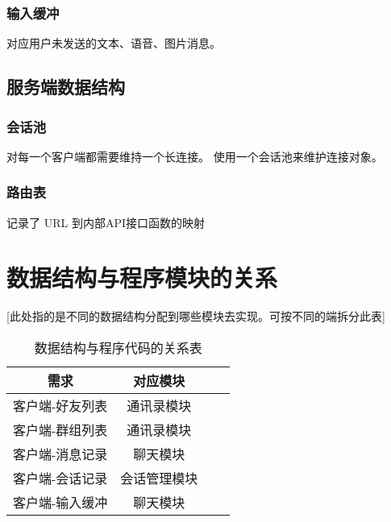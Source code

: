 \subsubsection{输入缓冲}
对应用户未发送的文本、语音、图片消息。

\subsection{服务端数据结构}

\subsubsection{会话池}
对每一个客户端都需要维持一个长连接。
使用一个会话池来维护连接对象。

\subsubsection{路由表}
记录了 URL 到内部API接口函数的映射



\section{数据结构与程序模块的关系}
[此处指的是不同的数据结构分配到哪些模块去实现。可按不同的端拆分此表]
\begin{table}[htbp]
\centering
\caption{数据结构与程序代码的关系表} \label{tab:datastructure-module}
\begin{tabular}{|c|c|c|c|}
    \hline
    需求 & 对应模块 \\
    \hline
    客户端-好友列表 & 通讯录模块 \\
    \hline
    客户端-群组列表 & 通讯录模块 \\
    \hline
    客户端-消息记录 & 聊天模块 \\
    \hline
    客户端-会话记录 & 会话管理模块 \\
    \hline
    客户端-输入缓冲 & 聊天模块 \\
    \hline
\end{tabular}
\end{table}